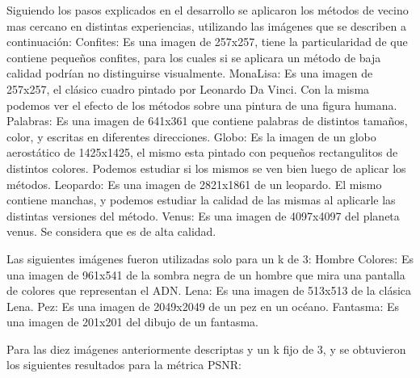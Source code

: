 \documentclass[a4paper]{article}
\newcounter{col}
\begin{document}
Siguiendo los pasos explicados en el desarrollo se aplicaron los métodos de vecino mas cercano en distintas experiencias, utilizando las imágenes que se describen a continuación:
\newline \newline Confites: Es una imagen de 257x257, tiene la particularidad de que contiene pequeños confites, para los cuales si se aplicara un método de baja calidad podrían no distinguirse visualmente.
\newline \newline MonaLisa: Es una imagen de 257x257, el clásico cuadro pintado por Leonardo Da Vinci. Con la misma podemos ver el efecto de los métodos sobre una pintura de una figura humana.
\newline \newline Palabras: Es una imagen de 641x361 que contiene palabras de distintos tamaños, color, y escritas en diferentes direcciones.
\newline \newline Globo: Es la imagen de un globo aerostático de 1425x1425, el mismo esta pintado con pequeños rectangulitos de distintos colores. Podemos estudiar si los mismos se ven bien luego de aplicar los métodos.
\newline \newline Leopardo: Es una imagen de 2821x1861 de un leopardo. El mismo contiene manchas, y podemos estudiar la calidad de las mismas al aplicarle las distintas versiones del método.
\newline \newline Venus: Es una imagen de 4097x4097 del planeta venus. Se considera que es de alta calidad.

Las siguientes imágenes fueron utilizadas solo para un k de 3:
\newline \newline Hombre Colores: Es una imagen de 961x541 de la sombra negra de un hombre que mira una pantalla de colores que representan el ADN.
\newline \newline Lena: Es una imagen de 513x513 de la clásica Lena.
\newline \newline Pez: Es una imagen de 2049x2049 de un pez en un océano.
\newline \newline Fantasma: Es una imagen de 201x201 del dibujo de un fantasma.

Para las diez imágenes anteriormente descriptas y un k fijo de 3, y se obtuvieron los siguientes resultados para la m\'etrica PSNR:
\end{document}
